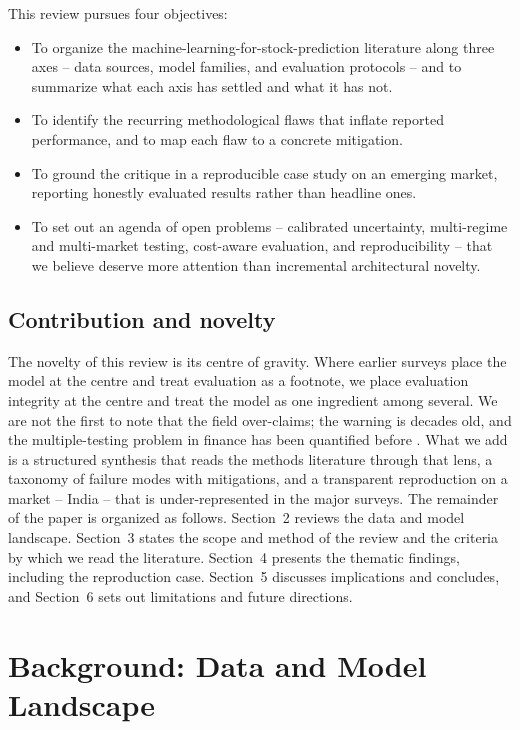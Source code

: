 \documentclass[10pt,a4paper,twocolumn]{article}
\begin{document}
This review pursues four objectives:
\begin{itemize}
  \item To organize the machine-learning-for-stock-prediction literature along three axes -- data sources, model families, and evaluation protocols -- and to summarize what each axis has settled and what it has not.
  \item To identify the recurring methodological flaws that inflate reported performance, and to map each flaw to a concrete mitigation.
  \item To ground the critique in a reproducible case study on an emerging market, reporting honestly evaluated results rather than headline ones.
  \item To set out an agenda of open problems -- calibrated uncertainty, multi-regime and multi-market testing, cost-aware evaluation, and reproducibility -- that we believe deserve more attention than incremental architectural novelty.
\end{itemize}

\subsection{Contribution and novelty}

The novelty of this review is its centre of gravity. Where earlier surveys place the model at the centre and treat evaluation as a footnote, we place evaluation integrity at the centre and treat the model as one ingredient among several. We are not the first to note that the field over-claims; the warning is decades old, and the multiple-testing problem in finance has been quantified before \cite{harvey2016}. What we add is a structured synthesis that reads the methods literature through that lens, a taxonomy of failure modes with mitigations, and a transparent reproduction on a market -- India -- that is under-represented in the major surveys. The remainder of the paper is organized as follows. Section~2 reviews the data and model landscape. Section~3 states the scope and method of the review and the criteria by which we read the literature. Section~4 presents the thematic findings, including the reproduction case. Section~5 discusses implications and concludes, and Section~6 sets out limitations and future directions.

\section{Background: Data and Model Landscape}
\end{document}

